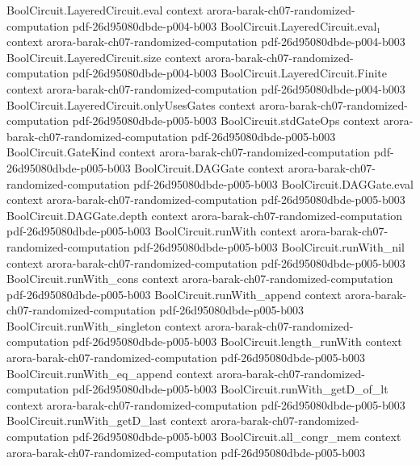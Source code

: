 \begin{theorem}
\proofstep
  {BoolCircuit.LayeredCircuit.eval}
  {context}
  {arora-barak-ch07-randomized-computation}
  {pdf-26d95080dbde-p004-b003}
\proofstep
  {BoolCircuit.LayeredCircuit.eval₁}
  {context}
  {arora-barak-ch07-randomized-computation}
  {pdf-26d95080dbde-p004-b003}
\proofstep
  {BoolCircuit.LayeredCircuit.size}
  {context}
  {arora-barak-ch07-randomized-computation}
  {pdf-26d95080dbde-p004-b003}
\proofstep
  {BoolCircuit.LayeredCircuit.Finite}
  {context}
  {arora-barak-ch07-randomized-computation}
  {pdf-26d95080dbde-p004-b003}
\proofstep
  {BoolCircuit.LayeredCircuit.onlyUsesGates}
  {context}
  {arora-barak-ch07-randomized-computation}
  {pdf-26d95080dbde-p005-b003}
\proofstep
  {BoolCircuit.stdGateOps}
  {context}
  {arora-barak-ch07-randomized-computation}
  {pdf-26d95080dbde-p005-b003}
\proofstep
  {BoolCircuit.GateKind}
  {context}
  {arora-barak-ch07-randomized-computation}
  {pdf-26d95080dbde-p005-b003}
\proofstep
  {BoolCircuit.DAGGate}
  {context}
  {arora-barak-ch07-randomized-computation}
  {pdf-26d95080dbde-p005-b003}
\proofstep
  {BoolCircuit.DAGGate.eval}
  {context}
  {arora-barak-ch07-randomized-computation}
  {pdf-26d95080dbde-p005-b003}
\proofstep
  {BoolCircuit.DAGGate.depth}
  {context}
  {arora-barak-ch07-randomized-computation}
  {pdf-26d95080dbde-p005-b003}
\proofstep
  {BoolCircuit.runWith}
  {context}
  {arora-barak-ch07-randomized-computation}
  {pdf-26d95080dbde-p005-b003}
\proofstep
  {BoolCircuit.runWith_nil}
  {context}
  {arora-barak-ch07-randomized-computation}
  {pdf-26d95080dbde-p005-b003}
\proofstep
  {BoolCircuit.runWith_cons}
  {context}
  {arora-barak-ch07-randomized-computation}
  {pdf-26d95080dbde-p005-b003}
\proofstep
  {BoolCircuit.runWith_append}
  {context}
  {arora-barak-ch07-randomized-computation}
  {pdf-26d95080dbde-p005-b003}
\proofstep
  {BoolCircuit.runWith_singleton}
  {context}
  {arora-barak-ch07-randomized-computation}
  {pdf-26d95080dbde-p005-b003}
\proofstep
  {BoolCircuit.length_runWith}
  {context}
  {arora-barak-ch07-randomized-computation}
  {pdf-26d95080dbde-p005-b003}
\proofstep
  {BoolCircuit.runWith_eq_append}
  {context}
  {arora-barak-ch07-randomized-computation}
  {pdf-26d95080dbde-p005-b003}
\proofstep
  {BoolCircuit.runWith_getD_of_lt}
  {context}
  {arora-barak-ch07-randomized-computation}
  {pdf-26d95080dbde-p005-b003}
\proofstep
  {BoolCircuit.runWith_getD_last}
  {context}
  {arora-barak-ch07-randomized-computation}
  {pdf-26d95080dbde-p005-b003}
\proofstep
  {BoolCircuit.all_congr_mem}
  {context}
  {arora-barak-ch07-randomized-computation}
  {pdf-26d95080dbde-p005-b003}
\proofstep

\end{theorem}

